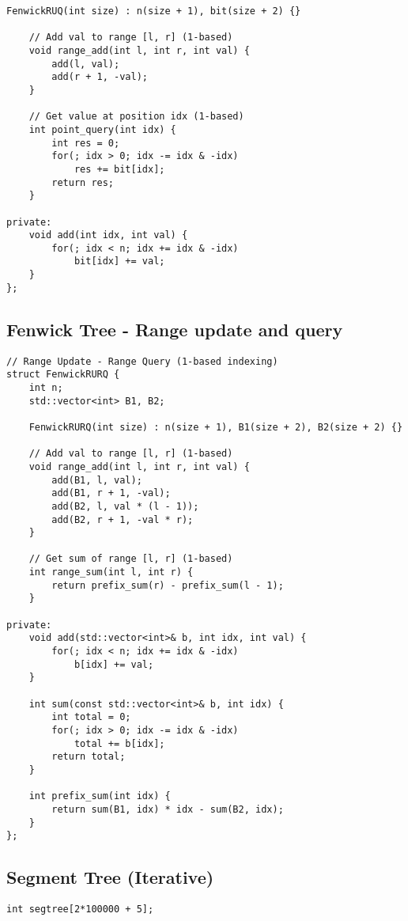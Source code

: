 \documentclass[10pt]{article}
\begin{document}
\begin{multicols*}{2}
\begin{lstlisting}[style=compactcpp]
    FenwickRUQ(int size) : n(size + 1), bit(size + 2) {}
    
    // Add val to range [l, r] (1-based)
    void range_add(int l, int r, int val) {
        add(l, val);
        add(r + 1, -val);
    }
    
    // Get value at position idx (1-based)
    int point_query(int idx) {
        int res = 0;
        for(; idx > 0; idx -= idx & -idx)
            res += bit[idx];
        return res;
    }

private:
    void add(int idx, int val) {
        for(; idx < n; idx += idx & -idx)
            bit[idx] += val;
    }
};
\end{lstlisting}

\subsection{Fenwick Tree - Range update and query}

\begin{lstlisting}[style=compactcpp]
// Range Update - Range Query (1-based indexing)
struct FenwickRURQ {
    int n;
    std::vector<int> B1, B2;
    
    FenwickRURQ(int size) : n(size + 1), B1(size + 2), B2(size + 2) {}
    
    // Add val to range [l, r] (1-based)
    void range_add(int l, int r, int val) {
        add(B1, l, val);
        add(B1, r + 1, -val);
        add(B2, l, val * (l - 1));
        add(B2, r + 1, -val * r);
    }
    
    // Get sum of range [l, r] (1-based)
    int range_sum(int l, int r) {
        return prefix_sum(r) - prefix_sum(l - 1);
    }

private:
    void add(std::vector<int>& b, int idx, int val) {
        for(; idx < n; idx += idx & -idx)
            b[idx] += val;
    }
    
    int sum(const std::vector<int>& b, int idx) {
        int total = 0;
        for(; idx > 0; idx -= idx & -idx)
            total += b[idx];
        return total;
    }
    
    int prefix_sum(int idx) {
        return sum(B1, idx) * idx - sum(B2, idx);
    }
};
\end{lstlisting}

\subsection{Segment Tree (Iterative)}

\begin{lstlisting}[style=compactcpp]
int segtree[2*100000 + 5];


\end{lstlisting}
\end{multicols*}
\end{document}
